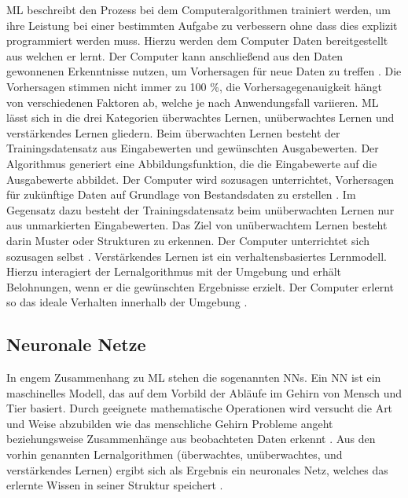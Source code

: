 \ac{ML} beschreibt den Prozess bei dem Computeralgorithmen trainiert werden, um ihre Leistung bei einer bestimmten Aufgabe zu verbessern ohne dass dies explizit programmiert werden muss.
Hierzu werden dem Computer Daten bereitgestellt aus welchen er lernt.
Der Computer kann anschließend aus den Daten gewonnenen Erkenntnisse nutzen, um Vorhersagen für neue Daten zu treffen \autocite[vgl.][S. 4]{judith_hurwitz_machine_2018}.
Die Vorhersagen stimmen nicht immer zu 100 \%, die Vorhersagegenauigkeit hängt von verschiedenen Faktoren ab, welche je nach Anwendungsfall variieren.
\newline
\ac{ML} lässt sich in die drei Kategorien überwachtes Lernen, unüberwachtes Lernen und verstärkendes Lernen gliedern.
Beim überwachten Lernen besteht der Trainingsdatensatz aus Eingabewerten und gewünschten Ausgabewerten.
Der Algorithmus generiert eine Abbildungsfunktion, die die Eingabewerte auf die Ausgabewerte abbildet.
Der Computer wird sozusagen unterrichtet, Vorhersagen für zukünftige Daten auf Grundlage von Bestandsdaten zu erstellen \autocite[vgl][S. 11]{thakkar_beginning_2019}.
Im Gegensatz dazu besteht der Trainingsdatensatz beim unüberwachten Lernen nur aus unmarkierten Eingabewerten.
Das Ziel von unüberwachtem Lernen besteht darin Muster oder Strukturen zu erkennen.
Der Computer unterrichtet sich sozusagen selbst \autocites[vgl.][S. 11-12]{thakkar_beginning_2019}[vgl.][S. 6]{etaati_machine_2019}.
Verstärkendes Lernen ist ein verhaltensbasiertes Lernmodell.
Hierzu interagiert der Lernalgorithmus mit der Umgebung und erhält Belohnungen, wenn er die gewünschten Ergebnisse erzielt. 
Der Computer erlernt so das ideale Verhalten innerhalb der Umgebung \autocite[vgl][S. 12]{thakkar_beginning_2019}.

\subsection{Neuronale Netze}\label{sec:neuronaleNetze}
In engem Zusammenhang zu \acl{ML} stehen die sogenannten \aclp{NN}.
Ein \ac{NN} ist ein maschinelles Modell, das auf dem Vorbild der Abläufe im Gehirn von Mensch und Tier basiert.
Durch geeignete mathematische Operationen wird versucht die Art und Weise abzubilden wie das menschliche Gehirn Probleme angeht beziehungsweise Zusammenhänge aus beobachteten Daten erkennt \autocites[vgl.][S. 604]{backhaus_multivariate_2016}[vgl.][S. 31]{judith_hurwitz_machine_2018}.
Aus den vorhin genannten Lernalgorithmen (überwachtes, unüberwachtes, und verstärkendes Lernen) ergibt sich als Ergebnis ein neuronales Netz, welches das erlernte Wissen in seiner Struktur speichert \autocite[vgl.][S. 427]{guresen_definition_2011}.


